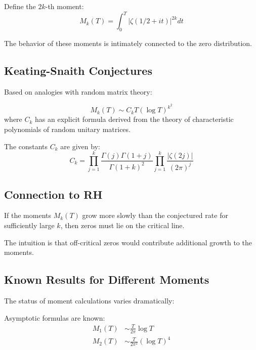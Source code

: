 Define the $2k$-th moment:
\begin{equation}
M_k(T) = \int_0^T |\zeta(1/2 + it)|^{2k} dt
\end{equation}

The behavior of these moments is intimately connected to the zero distribution.

\subsection{Keating-Snaith Conjectures}

Based on analogies with random matrix theory:

\begin{conjecture}
\begin{equation}
M_k(T) \sim C_k T(\log T)^{k^2}
\end{equation}
where $C_k$ has an explicit formula derived from the theory of characteristic polynomials of random unitary matrices.
\end{conjecture}

The constants $C_k$ are given by:
\begin{equation}
C_k = \prod_{j=1}^k \frac{\Gamma(j)\Gamma(1+j)}{\Gamma(1+k)^2} \prod_{j=1}^k \frac{|\zeta(2j)|}{(2\pi)^j}
\end{equation}

\subsection{Connection to RH}

\begin{theorem}
If the moments $M_k(T)$ grow more slowly than the conjectured rate for sufficiently large $k$, then zeros must lie on the critical line.
\end{theorem}

The intuition is that off-critical zeros would contribute additional growth to the moments.

\subsection{Known Results for Different Moments}

The status of moment calculations varies dramatically:

\begin{theorem}
Asymptotic formulas are known:
\begin{align}
M_1(T) &\sim \frac{T}{2\pi} \log T \\
M_2(T) &\sim \frac{T}{2\pi^2} (\log T)^4
\end{align}
\end{theorem}

